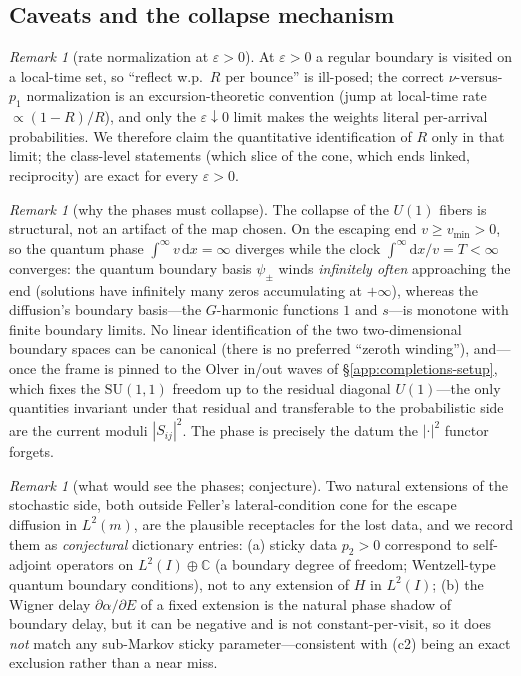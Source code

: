 \documentclass[11pt]{article}
\theoremstyle{definition}
\theoremstyle{remark}
\newtheorem{remark}[theorem]{Remark}
\newcommand{\dd}{\mathrm{d}}
\begin{document}
\subsection{Caveats and the collapse mechanism}
\label{app:completions-caveats}

\begin{remark}[rate normalization at $\varepsilon>0$]\label{rem:ratenorm}
At $\varepsilon>0$ a regular boundary is visited on a local-time set,
so ``reflect w.p.~$R$ per bounce'' is ill-posed; the correct
$\nu$-versus-$p_{1}$ normalization is an excursion-theoretic convention
(jump at local-time rate $\propto(1-R)/R$), and only the
$\varepsilon\downarrow0$ limit makes the weights literal per-arrival
probabilities. We therefore claim the quantitative identification of
$R$ only in that limit; the class-level statements (which slice of the
cone, which ends linked, reciprocity) are exact for every
$\varepsilon>0$.
\end{remark}

\begin{remark}[why the phases must collapse]\label{rem:phasecollapse}
The collapse of the $U(1)$ fibers is structural, not an artifact of the
map chosen. On the escaping end $v\ge v_{\min}>0$, so the quantum phase
$\int^{\infty}v\,\dd x=\infty$ diverges while the clock
$\int^{\infty}\dd x/v=T<\infty$ converges: the quantum boundary basis
$\psi_{\pm}$ winds \emph{infinitely often} approaching the end
(solutions have infinitely many zeros accumulating at $+\infty$),
whereas the diffusion's boundary basis---the $G$-harmonic functions $1$
and $s$---is monotone with finite boundary limits. No linear
identification of the two two-dimensional boundary spaces can be
canonical (there is no preferred ``zeroth winding''), and---once the frame
is pinned to the Olver in/out waves of \S\ref{app:completions-setup}, which
fixes the $\mathrm{SU}(1,1)$ freedom up to the residual diagonal
$U(1)$---the only quantities invariant under that residual and transferable
to the probabilistic side are the current moduli $|S_{ij}|^{2}$. The phase
is precisely the datum the $|\cdot|^{2}$ functor forgets.
\end{remark}

\begin{remark}[what would see the phases; conjecture]
\label{rem:phasereceptacle}
Two natural extensions of the stochastic side, both outside Feller's
lateral-condition cone for the escape diffusion in $L^{2}(m)$, are the
plausible receptacles for the lost data, and we record them as
\emph{conjectural} dictionary entries: (a) sticky data $p_{2}>0$
correspond to self-adjoint operators on $L^{2}(I)\oplus\mathbb{C}$ (a
boundary degree of freedom; Wentzell-type quantum boundary conditions),
not to any extension of $H$ in $L^{2}(I)$; (b) the Wigner delay
$\partial\alpha/\partial E$ of a fixed extension is the natural phase
shadow of boundary delay, but it can be negative and is not
constant-per-visit, so it does \emph{not} match any sub-Markov sticky
parameter---consistent with (c2) being an exact exclusion rather than a
near miss.
\end{remark}
\end{document}
